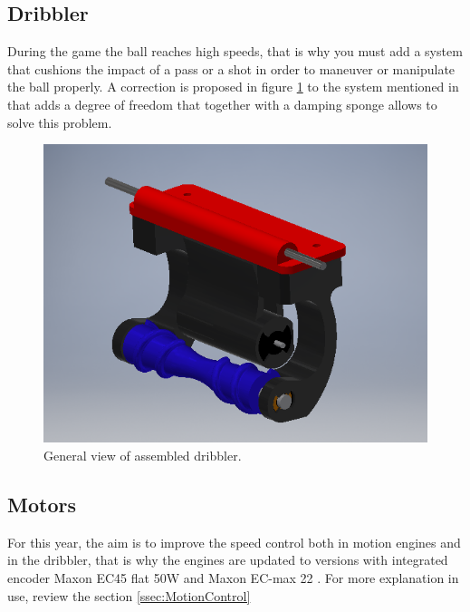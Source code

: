 \documentclass{llncs}
\begin{document}
\subsection{Dribbler}

During the game the ball reaches high speeds, that is why you must add a system that cushions the impact of a pass or a shot in order to maneuver or manipulate the ball properly. A correction is proposed in figure \ref{fig:dribbler} to the system mentioned in \cite{ais2018tdp} that adds a degree of freedom that together with a damping sponge allows to solve this problem.

\begin{figure}[h]
    \centering
    \includegraphics[scale=0.6]{Images/Dribbler.jpeg}
    \caption{General view of assembled dribbler. }
    \label{fig:dribbler}
\end{figure}

\subsection{Motors}
\label{Encoder}

For this year, the aim is to improve the speed control both in motion engines and in the dribbler, that is why the engines are updated to versions with integrated encoder Maxon EC45 flat 50W \cite{MaxonEC45} and Maxon EC-max 22 \cite{MaxonECmax}. For more explanation in use, review the section \ref{ssec:MotionControl}



\end{document}
